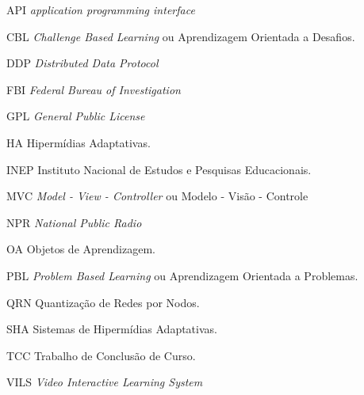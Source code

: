 \begin{siglas}
  \item[API] \textit{application programming interface}  
  \item[CBL] \textit{Challenge Based Learning} ou Aprendizagem Orientada a Desafios.  
  \item[DDP] \textit{Distributed Data Protocol}  
  \item[FBI] \textit{Federal Bureau of Investigation}  
  \item[GPL] \textit{General Public License}
  \item[HA] Hipermídias Adaptativas.
  \item[INEP] Instituto Nacional de Estudos e Pesquisas Educacionais.  
  \item[MVC] \textit{Model - View - Controller} ou Modelo - Visão - Controle 
  \item[NPR] \textit{National Public Radio} 
  \item[OA] Objetos de Aprendizagem.  
  \item[PBL] \textit{Problem Based Learning} ou Aprendizagem Orientada a Problemas.  
  \item[QRN] Quantização de Redes por Nodos. 
  \item[SHA] Sistemas de Hipermídias Adaptativas.
  \item[TCC] Trabalho de Conclusão de Curso.
  \item[VILS] \textit{Video Interactive Learning System}
  \end{siglas}
 